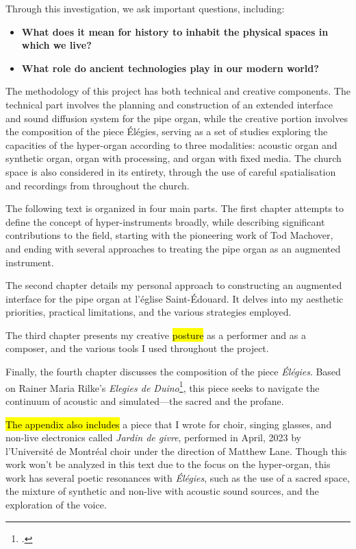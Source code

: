 \documentclass[12pt,twoside,maitrise]{dms_ks}
\theoremstyle{definition}
\begin{document}
{Through this investigation, we ask important questions, including:
\begin{itemize}
    \item \textbf{What does it mean for history to inhabit the physical spaces in which we live?}
    \item \textbf{What role do ancient technologies play in our modern world?}
\end{itemize}

The methodology of this project has both technical and creative components. 
The technical part involves the planning and construction of an extended interface and sound diffusion system for the pipe organ, while the creative portion involves the composition of the piece Élégies, serving as a set of studies exploring the capacities of the hyper-organ according to three modalities: acoustic organ and synthetic organ, organ with processing, and organ with fixed media. 
The church space is also considered in its entirety, through the use of careful spatialisation and recordings from throughout the church.									

The following text is organized in four main parts. 
The first chapter attempts to define the concept of hyper-instruments broadly, while describing significant contributions to the field, starting with the pioneering work of Tod Machover, and ending with several approaches to treating the pipe organ as an augmented instrument.

The second chapter details my personal approach to constructing an augmented interface for the pipe organ at l’église Saint-Édouard. 
It delves into my aesthetic priorities, practical limitations, and the various strategies employed. 

The third chapter presents my creative \hl{posture} as a performer and as a composer, and the various tools I used throughout the project. 

Finally, the fourth chapter discusses the composition of the piece \textit{Élégies}. 
Based on Rainer Maria Rilke's \textit{Elegies de Duino}\footcite{rilke_egies_1986}, this piece seeks to navigate the continuum of acoustic and simulated---the sacred and the profane.

\hl{The appendix also includes} a piece that I wrote for choir, singing glasses, and non-live electronics called \textit{Jardin de givre}, performed in April, 2023 by l'Université de Montréal choir under the direction of Matthew Lane. Though this work won't be analyzed in this text due to the focus on the hyper-organ, this work has several poetic resonances with \textit{Élégies}, such as the use of a sacred space, the mixture of synthetic and non-live with acoustic sound sources, and the exploration of the voice.

}
\end{document}
